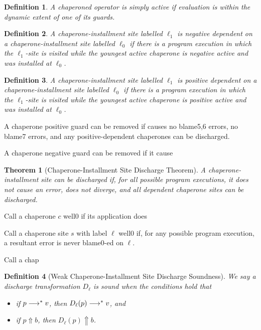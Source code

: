 \documentclass{sigplanconf}
\newtheorem{definition}{Definition}
\newtheorem{theorem}{Theorem}
\begin{document}
\begin{definition}
A chaperoned operator is simply \emph{active} if evaluation is within the dynamic extent of one of its guards.
\end{definition}

\begin{definition}
A chaperone-installment site labelled $\ell_1$ is \emph{negative dependent} on a chaperone-installment site labelled $\ell_0$ if there is a program execution in which the $\ell_1$-site is visited while the youngest active chaperone is negative active and was installed at $\ell_0$.
\end{definition}

\begin{definition}
A chaperone-installment site labelled $\ell_1$ is \emph{positive dependent} on a chaperone-installment site labelled $\ell_0$ if there is a program execution in which the $\ell_1$-site is visited while the youngest active chaperone is positive active and was installed at $\ell_0$.
\end{definition}

A chaperone positive guard can be removed if causes no blame5,6 errors, no blame7 errors, and any positive-dependent chaperones can be discharged.

A chaperone negative guard can be removed if it cause

\begin{theorem}[Chaperone-Installment Site Discharge Theorem]
A chaperone-installment site can be discharged if, for all possible program executions, it does not cause an error, does not diverge, and all dependent chaperone sites can be discharged.
\end{theorem}

Call a chaperone $c$ well0 if its application does

Call a chaperone site $s$ with label $\ell$ well0 if, for any possible program execution, a resultant error is never blame0-ed on $\ell$.

Call a chap



\begin{definition}[Weak Chaperone-Installment Site Discharge Soundness]
We say a discharge transformation $D_\ell$ is sound when the conditions hold that
\begin{itemize}
\item if $p\longrightarrow^{*} v$, then $D_\ell(p)\longrightarrow^{*} v$, and
\item if $p\Uparrow b$, then $D_\ell(p)\Uparrow b$.
\end{itemize}
\end{definition}
\end{document}
